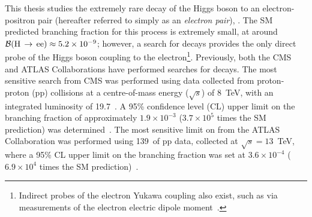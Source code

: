 

This thesis studies the extremely rare decay of the Higgs boson to an electron-positron pair (hereafter referred to simply as an \textit{electron pair}), \Hee. The SM predicted branching fraction for this process is extremely small, at around ${\mathcal{B}(\mathrm{H}\,\rightarrow\,\mathrm{ee}) \approx 5.2\times10^{-9}}$; however, a search for \Hee decays provides the only direct probe of the Higgs boson coupling to the electron\footnote{Indirect probes of the electron Yukawa coupling also exist, such as via measurements of the electron electric dipole moment~\cite{ACME}.}. Previously, both the CMS and ATLAS Collaborations have performed searches for \Hee decays. The most sensitive search from CMS was performed using data collected from proton-proton (pp) collisions at a centre-of-mass energy (${\sqrt{s}}$) of 8~TeV, with an integrated luminosity of 19.7~\fbinv. A 95\% confidence level (CL) upper limit on the \Hee branching fraction of approximately ${1.9\times10^{-3}}$ (${3.7 \times 10^{5}}$ times the SM prediction) was determined~\cite{CMSHeeRun1}. The most sensitive limit on \BHee from the ATLAS Collaboration was performed using 139~\fbinv of pp data, collected at ${\sqrt{s}=13}$~TeV, where a 95\% CL upper limit on the branching fraction was set at ${3.6\times10^{-4}}$ (${6.9 \times 10^{4}}$ times the SM prediction)~\cite{ATLASHeeRun2}.

